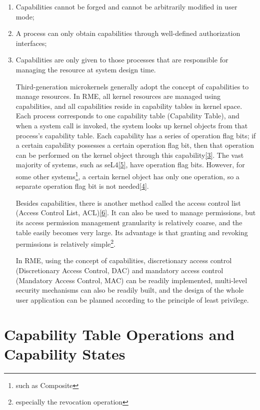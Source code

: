 \begin{enumerate}
\def\labelenumi{\arabic{enumi}.}
\item
  Capabilities cannot be forged and cannot be arbitrarily modified in user mode;
\item
  A process can only obtain capabilities through well-defined authorization interfaces;
\item
  Capabilities are only given to those processes that are responsible for managing the resource at system design time.

  Third-generation microkernels generally adopt the concept of capabilities to manage resources. In RME, all kernel resources are managed using capabilities, and all capabilities reside in capability tables in kernel space. Each process corresponds to one capability table (Capability
  Table), and when a system call is invoked, the system looks up kernel objects from that process's capability table. Each capability has a series of operation flag bits; if a certain capability possesses a certain operation flag bit, then that operation can be performed on the kernel object through this capability\hyperref[cite:2-3]{{[}3{]}}. The vast majority of systems, such as seL4\hyperref[cite:2-5]{{[}5{]}}, have operation flag bits. However, for some other systems\footnote{such as Composite}, a certain kernel object has only one operation, so a separate operation flag bit is not needed\hyperref[cite:2-4]{{[}4{]}}.

  Besides capabilities, there is another method called the access control list (Access Control List, ACL)\hyperref[cite:2-6]{{[}6{]}}. It can also be used to manage permissions, but its access permission management granularity is relatively coarse, and the table easily becomes very large. Its advantage is that granting and revoking permissions is relatively simple\footnote{especially the revocation operation}.

  In RME, using the concept of capabilities, discretionary access control (Discretionary Access
  Control, DAC) and mandatory access control (Mandatory Access
  Control, MAC) can be readily implemented, multi-level security mechanisms can also be readily built, and the design of the whole user application can be planned according to the principle of least privilege.
\end{enumerate}

\section{Capability Table Operations and Capability States}\label{sec:2-capability-table-operations-and-states}

